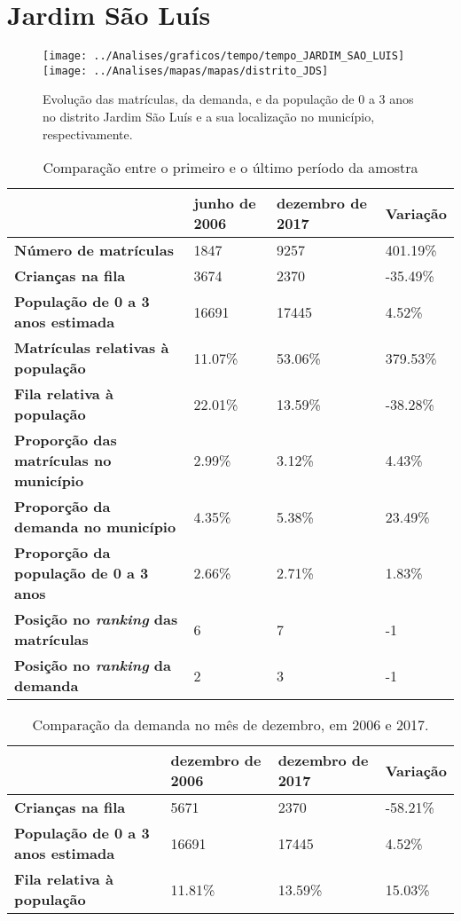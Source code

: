 \section{Jardim São Luís}
\begin{figure}[H]
\centering
\texttt{[image: ../Analises/graficos/tempo/tempo\_JARDIM\_SAO\_LUIS]}
\texttt{[image: ../Analises/mapas/mapas/distrito\_JDS]}
\caption{Evolução das matrículas, da demanda, e da população de 0 a 3 anos no distrito Jardim São Luís e a sua localização no município, respectivamente.}
\end{figure}
\begin{table}[H]
\begin{tabular}{l|l|l|l}
\textbf{}                                      & \textbf{junho de 2006}       & \textbf{dezembro de 2017}    & \textbf{Variação} \\ \hline
\textbf{Número de matrículas}                  & 1847 & 9257 & 401.19\% \\ \hline
\textbf{Crianças na fila}                      & 3674 & 2370 & -35.49\% \\ \hline
\textbf{População de 0 a 3 anos estimada}      & 16691 & 17445 & 4.52\% \\ \hline
\textbf{Matrículas relativas à população}      & 11.07\% & 53.06\% & 379.53\% \\ \hline
\textbf{Fila relativa à população}             & 22.01\% & 13.59\% & -38.28\% \\ \hline
\textbf{Proporção das matrículas no município} & 2.99\% & 3.12\% & 4.43\% \\ \hline
\textbf{Proporção da demanda no município}     & 4.35\% & 5.38\% & 23.49\% \\ \hline
\textbf{Proporção da população de 0 a 3 anos}  & 2.66\% & 2.71\% & 1.83\% \\ \hline
\textbf{Posição no \textit{ranking} das matrículas}     & 6 & 7 & -1 \\ \hline
\textbf{Posição no \textit{ranking} da demanda}         & 2 & 3 & -1 \\ 
\end{tabular}
\caption{Comparação entre o primeiro e o último período da amostra}
\end{table}
\begin{table}[H]
\begin{tabular}{l|l|l|l}
\textbf{}                                 & \textbf{dezembro de 2006} & \textbf{dezembro de 2017} & \textbf{Variação} \\ \hline
\textbf{Crianças na fila}                      & 5671 & 2370 & -58.21\% \\ \hline
\textbf{População de 0 a 3 anos estimada}      & 16691 & 17445 & 4.52\% \\ \hline
\textbf{Fila relativa à população}             & 11.81\% & 13.59\% & 15.03\% \\
\end{tabular}
\caption{Comparação da demanda no mês de dezembro, em 2006 e 2017.}
\end{table}
